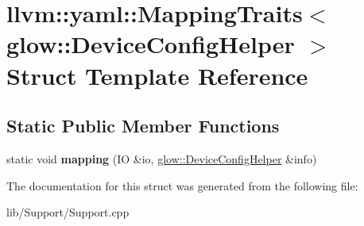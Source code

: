 \hypertarget{structllvm_1_1yaml_1_1_mapping_traits_3_01glow_1_1_device_config_helper_01_4}{}\section{llvm\+:\+:yaml\+:\+:Mapping\+Traits$<$ glow\+:\+:Device\+Config\+Helper $>$ Struct Template Reference}
\label{structllvm_1_1yaml_1_1_mapping_traits_3_01glow_1_1_device_config_helper_01_4}
\subsection*{Static Public Member Functions}
\begin{DoxyCompactItemize}
\item 
\mbox{\label{structllvm_1_1yaml_1_1_mapping_traits_3_01glow_1_1_device_config_helper_01_4_a0c6eb0b8e04caa675c082006c6af118b}} 
static void {\bfseries mapping} (IO \&io, \hyperlink{structglow_1_1_device_config_helper}{glow\+::\+Device\+Config\+Helper} \&info)
\end{DoxyCompactItemize}


The documentation for this struct was generated from the following file\+:\begin{DoxyCompactItemize}
\item 
lib/\+Support/Support.\+cpp\end{DoxyCompactItemize}

